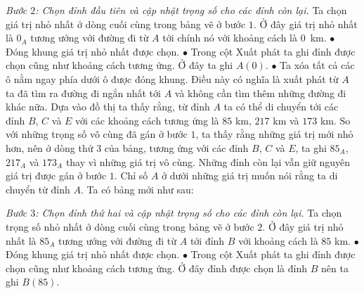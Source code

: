 \begin{multicols}{2}
	\textit{Bước $2$: Chọn đỉnh đầu tiên và cập nhật trọng số cho các đỉnh còn lại.}   
	Ta chọn giá trị nhỏ nhất ở dòng cuối cùng trong bảng vẽ ở bước $1$. Ở đây giá trị nhỏ nhất là $0_A$ tương ướng với đường đi từ $A$ tới chính nó với khoảng cách là $0$~km.
	\vskip 0.1cm
	$\bullet$ Đóng khung giá trị nhỏ nhất được chọn. 
	\vskip 0.1cm
	$\bullet$ Trong cột Xuất phát ta ghi đỉnh được chọn cũng như khoảng cách tương ứng. Ở đây ta ghi $A(0)$.
	\vskip 0.1cm
	$\bullet$ Ta xóa tất cả các ô nằm ngay phía dưới ô được đóng khung. Điều này có nghĩa là xuất phát từ $A$ ta đã tìm ra đường đi ngắn nhất tới $A$ và không cần tìm thêm những đường đi khác nữa.
	\vskip 0.1cm 
	Dựa vào đồ thị ta thấy rằng, từ đỉnh $A$ ta có thể di chuyển tới các đỉnh $B$, $C$ và $E$ với các khoảng cách tương ứng là $85$ km, $217$ km và $173$ km. So với những trọng số vô cùng đã gán ở bước $1$, ta thấy rằng những giá trị mới nhỏ hơn, nên ở dòng thứ $3$ của bảng, tương ứng với các đỉnh $B$, $C$ và $E$, ta ghi $85_A$, $217_A$ và $173_A$ thay vì những giá trị vô cùng. Những đỉnh còn lại vẫn giữ nguyên giá trị được gán ở bước $1$. Chỉ số $A$ ở dưới những giá trị muốn nói rằng ta di chuyển từ đỉnh $A$.
	\vskip 0.1cm 
	Ta có bảng mới như sau: 
	\begin{table}[H]
		\vspace*{-5pt}
		\centering
		\captionsetup{labelformat= empty, justification=centering}
		\vspace*{-10pt}
	\end{table}
	\textit{Bước $3$: Chọn đỉnh thứ hai và cập nhật trọng số cho các đỉnh còn lại.}  Ta chọn trọng số nhỏ nhất ở dòng cuối cùng trong bảng vẽ ở bước $2$. Ở đây giá trị nhỏ nhất là $85_A$ tương ướng với đường đi từ $A$ tới đỉnh $B$ với khoảng cách là  $85$ km.
	\vskip 0.1cm
	$\bullet$ Đóng khung giá trị nhỏ nhất được chọn. 
	\vskip 0.1cm
	$\bullet$ Trong cột Xuất phát ta ghi đỉnh được chọn cũng như khoảng cách tương ứng. Ở đây đỉnh được chọn là đỉnh $B$ nên ta ghi $B(85)$.
	\vskip 0.1cm

\end{multicols}
